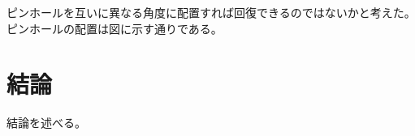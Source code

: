 ピンホールを互いに異なる角度に配置すれば回復できるのではないかと考えた。
ピンホールの配置は図に示す通りである。


\clearpage
\newpage



\section{結論}
\label{chap3_conclusion}
結論を述べる。


